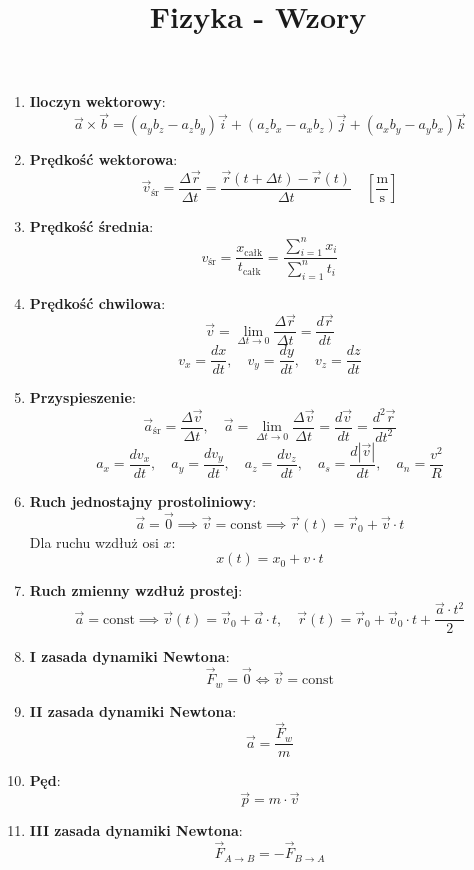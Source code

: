 \documentclass{article}
\author{}
\title{Fizyka - Wzory}
\date{}
\begin{document}
	\maketitle
	
	\begin{enumerate}
		
		\item \textbf{Iloczyn wektorowy}:
		\[
		\vec{a} \times \vec{b} = (a_yb_z - a_zb_y)\vec{i} + (a_zb_x - a_xb_z)\vec{j} + (a_xb_y - a_yb_x)\vec{k}
		\]
		
		\item \textbf{Prędkość wektorowa}:
		\[
		\vec{v}_\text{śr} = \frac{\Delta\vec{r}}{\Delta t} = \frac{\vec{r}(t + \Delta t) - \vec{r}(t)}{\Delta t} \quad \left[\frac{\text{m}}{\text{s}}\right]
		\]
		
		\item \textbf{Prędkość średnia}:
		\[
		v_\text{śr} = \frac{x_\text{całk}}{t_\text{całk}} = \frac{\sum_{i=1}^{n}x_i}{\sum_{i=1}^{n}t_i}
		\]
		
		\item \textbf{Prędkość chwilowa}:
		\[
		\vec{v} = \lim_{\Delta t \to 0} \frac{\Delta \vec{r}}{\Delta t} = \frac{d \vec{r}}{dt}
		\]
		\[
		v_x = \frac{dx}{dt}, \quad v_y = \frac{dy}{dt}, \quad v_z = \frac{dz}{dt}
		\]
		
		\item \textbf{Przyspieszenie}:
		\[
		\vec{a}_\text{śr} = \frac{\Delta \vec{v}}{\Delta t}, \quad 
		\vec{a} = \lim_{\Delta t \to 0} \frac{\Delta \vec{v}}{\Delta t} = \frac{d \vec{v}}{dt} = \frac{d^2 \vec{r}}{dt^2}
		\]
		\[
		a_x = \frac{dv_x}{dt}, \quad a_y = \frac{dv_y}{dt}, \quad a_z = \frac{dv_z}{dt}, \quad a_s = \frac{d|\vec{v}|}{dt}, \quad a_n = \frac{v^2}{R}
		\]
		
		\item \textbf{Ruch jednostajny prostoliniowy}:
		\[
		\vec{a} = \vec{0} \implies \vec{v} = \text{const} \implies \vec{r}(t) = \vec{r}_0 + \vec{v} \cdot t
		\]
		Dla ruchu wzdłuż osi \(x\):
		\[
		x(t) = x_0 + v \cdot t
		\]
		
		\item \textbf{Ruch zmienny wzdłuż prostej}:
		\[
		\vec{a} = \text{const} \implies \vec{v}(t) = \vec{v}_0 + \vec{a} \cdot t, \quad \vec{r}(t) = \vec{r}_0 + \vec{v}_0 \cdot t + \frac{\vec{a} \cdot t^2}{2}
		\]
		
		\item \textbf{I zasada dynamiki Newtona}:
		\[
		\vec{F}_w = \vec{0} \iff \vec{v} = \text{const}
		\]
		
		\item \textbf{II zasada dynamiki Newtona}:
		\[
		\vec{a} = \frac{\vec{F}_w}{m}
		\]
		
		\item \textbf{Pęd}:
		\[
		\vec{p} = m \cdot \vec{v}
		\]
		
		\item \textbf{III zasada dynamiki Newtona}:
		\[
		\vec{F}_{A \to B} = -\vec{F}_{B \to A}
		\]
		
	\end{enumerate}
	
\end{document}
